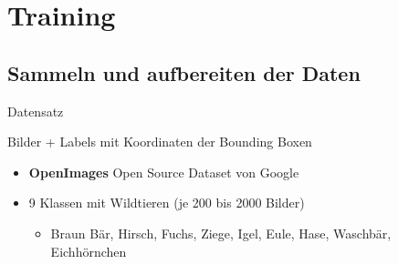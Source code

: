 \section[\thesection \  Training]{Training}\label{sec:training}
%
%





\subsection[\thesection .\thesubsection \ 
Sammeln und aufbereiten der Daten]{Sammeln und aufbereiten der Daten}\label{subsec:collect_data}
\begin{frame}{Datensatz}
   
   Bilder + Labels mit Koordinaten der Bounding Boxen

    \begin{itemize}
        \item \textbf{OpenImages} Open Source Dataset von Google
    \end{itemize}
    \begin{itemize}
        \item 9 Klassen mit Wildtieren (je 200 bis 2000 Bilder)
        \begin{itemize}
            \item Braun Bär, Hirsch, Fuchs, Ziege, Igel, Eule, Hase, Waschbär, Eichhörnchen
        \end{itemize}
    \end{itemize}
    \vspace{0.5cm}
    
\end{frame}

